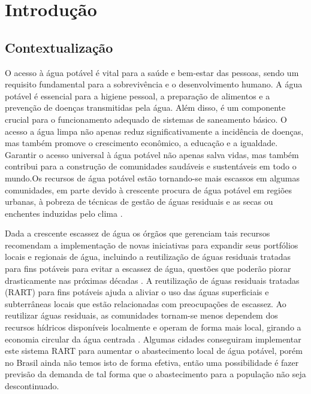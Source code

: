 


\section{Introdu{\c c}{\~a}o} \label{sec:int}

\subsection{Contextualiza\c c\~ao} \label{subsec:contexto}

O acesso à água potável é vital para a saúde e bem-estar das pessoas, sendo um requisito fundamental para a sobrevivência e o desenvolvimento humano. A água potável é essencial para a higiene pessoal, a preparação de alimentos e a prevenção de doenças transmitidas pela água. Além disso, é um componente crucial para o funcionamento adequado de sistemas de saneamento básico. O acesso a água limpa não apenas reduz significativamente a incidência de doenças, mas também promove o crescimento econômico, a educação e a igualdade. Garantir o acesso universal à água potável não apenas salva vidas, mas também contribui para a construção de comunidades saudáveis e sustentáveis em todo o mundo.Os recursos de água potável estão tornando-se mais escassos em algumas comunidades, em parte devido à crescente procura de água potável em regiões urbanas, à pobreza de técnicas de gestão de águas residuais e as secas ou enchentes induzidas pelo clima
\cite{10.2166/wp.2022.071}.

Dada a crescente escassez de água os órgãos que gerenciam tais recursos recomendam a implementação de novas iniciativas para expandir seus portfólios locais e regionais de água, incluindo a reutilização de águas residuais tratadas para fins potáveis para evitar a escassez de água, questões que poderão piorar drasticamente nas próximas décadas \cite{BARNES2023139587}. A reutilização de águas residuais tratadas (RART) para fins potáveis ajuda a aliviar o uso das águas superficiais e subterrâneas locais que estão relacionadas com preocupações de escassez. Ao reutilizar águas residuais, as comunidades tornam-se menos dependem dos recursos hídricos disponíveis localmente e operam de forma mais local, girando a economia circular da água centrada \cite{TSATSOU2023136325}. Algumas cidades conseguiram implementar este sistema RART para aumentar o abastecimento local de água potável, porém no Brasil ainda não temos isto de forma efetiva, então uma possibilidade é fazer previsão da demanda de tal forma que o abastecimento para a população não seja descontinuado. 

